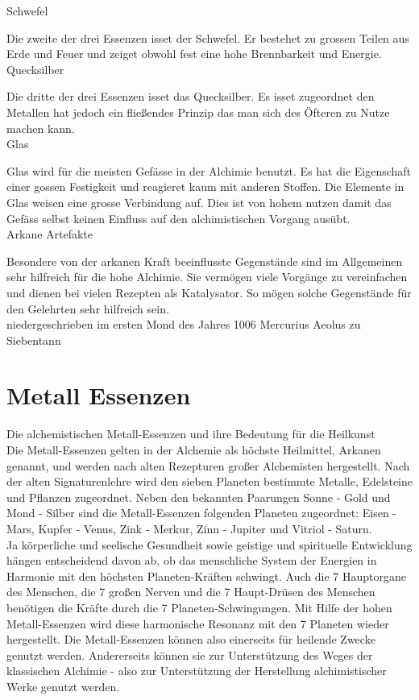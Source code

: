 \documentclass[a5paper,8pt]{book}
\begin{document}
\noindent Schwefel\

Die zweite der drei Essenzen isset der Schwefel. Er bestehet zu grossen Teilen aus Erde und Feuer und zeiget obwohl fest eine hohe Brennbarkeit und Energie.\\

\noindent Quecksilber\

Die dritte der drei Essenzen isset das Quecksilber. Es isset zugeordnet den Metallen hat jedoch ein fließendes Prinzip das man sich des Öfteren zu Nutze machen kann.\\

\noindent Glas\

Glas wird für die meisten Gefässe in der Alchimie benutzt. Es hat die Eigenschaft einer gossen Festigkeit und reagieret kaum mit anderen Stoffen. Die Elemente 
in Glas weisen eine grosse Verbindung auf. Dies ist von hohem nutzen damit das Gefäss selbst keinen Einfluss auf den alchimistischen Vorgang ausübt.\\

\noindent Arkane Artefakte\

Besondere von der arkanen Kraft beeinflusste Gegenstände sind im Allgemeinen sehr hilfreich für die hohe Alchimie. Sie vermögen viele Vorgänge zu vereinfachen 
und dienen bei vielen Rezepten als Katalysator. So mögen solche Gegenstände für den Gelehrten sehr hilfreich sein. \\


niedergeschrieben im ersten Mond des Jahres 1006
Mercurius Aeolus zu Siebentann 


\newpage

\section{Metall Essenzen}

Die alchemistischen Metall-Essenzen und ihre Bedeutung für die Heilkunst\\

Die Metall-Essenzen gelten in der Alchemie als höchste Heilmittel, Arkanen genannt, und werden nach alten Rezepturen großer Alchemisten hergestellt. Nach der alten 
Signaturenlehre wird den sieben Planeten bestimmte Metalle, Edelsteine  und Pflanzen zugeordnet. Neben den bekannten Paarungen 
Sonne - Gold und Mond - Silber sind die Metall-Essenzen folgenden Planeten zugeordnet: Eisen - Mars, Kupfer - Venus, 
Zink - Merkur, Zinn - Jupiter und Vitriol - Saturn. \\

Ja körperliche und seelische Gesundheit sowie geistige und spirituelle Entwicklung hängen entscheidend davon ab, ob das menschliche System der Energien in Harmonie 
mit den höchsten Planeten-Kräften schwingt. Auch die 7 Hauptorgane des Menschen, die 7 großen Nerven und die 7 Haupt-Drüsen des Menschen benötigen die Kräfte durch 
die 7 Planeten-Schwingungen. Mit Hilfe der hohen Metall-Essenzen wird diese harmonische Resonanz mit den 7 Planeten wieder hergestellt. Die Metall-Essenzen können 
also einerseits für heilende Zwecke genutzt werden. Andererseits können sie zur Unterstützung des Weges der klassischen Alchimie - also zur Unterstützung der 
Herstellung alchimistischer Werke genutzt werden.\\
\end{document}
